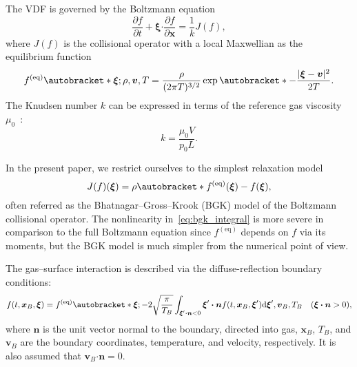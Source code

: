 \documentclass{elsarticle} %
\newcommand{\dd}{\mathrm{d}}
\newcommand{\pder}[2][]{\frac{\partial#1}{\partial#2}}
\DeclarePairedDelimiter\autobracket()       %
\newcommand{\br}[1]{\autobracket*{#1}}
\newcommand{\dxi}{\dd{\boldsymbol{\xi}}}
\newcommand{\bxi}{\boldsymbol{\xi}}
\newcommand{\bv}{\boldsymbol{v}}
\newcommand{\bn}{\boldsymbol{n}}
\newcommand{\bdot}{\boldsymbol{\cdot}}
\newcommand{\bx}{\boldsymbol{x}}
\newcommand{\equil}[1]{#1^\mathrm{(eq)}}
\newcommand{\refer}[1]{#1_0}
\begin{document}
The VDF is governed by the Boltzmann equation
\begin{equation}\label{eq:Boltzmann}
    \pder[f]{t} + \bxi\bdot\pder[f]{\bx} = \frac1kJ(f),
\end{equation}
where \(J(f)\) is the collisional operator with a local Maxwellian as the equilibrium function
\begin{equation}\label{eq:equilibrium}
    \equil{f}\br{\bxi; \rho, \bv, T} = \frac{\rho}{(2\pi T)^{3/2}}\exp\br{-\frac{|\bxi-\bv|^2}{2T}}.
\end{equation}
The Knudsen number \(k\) can be expressed in terms of the reference gas viscosity \(\refer\mu\)~\cite{Sharipov1998}:
\begin{equation}\label{eq:Knudsen_number}
    k = \frac{\refer\mu V}{\refer{p}L}.
\end{equation}

In the present paper, we restrict ourselves to the simplest relaxation model~\cite{Krook1954, Welander1954}
\begin{equation}\label{eq:bgk_integral}
    J(f)(\bxi) = \rho\br{\equil{f}(\bxi) - f(\bxi)},
\end{equation}
often referred as the Bhatnagar--Gross--Krook (BGK) model of the Boltzmann collisional operator.
The nonlinearity in~\eqref{eq:bgk_integral} is more severe in comparison to the full Boltzmann equation
since \(\equil{f}\) depends on \(f\) via its moments,
but the BGK model is much simpler from the numerical point of view.

The gas--surface interaction is described via the diffuse-reflection boundary conditions:
\begin{equation}\label{eq:diffuse}
    f(t,\bx_B,\bxi) = \equil{f} \br{ \bxi;
        -2\sqrt\frac\pi{T_B} \int_{\bxi'\bdot\bn<0} \bxi'\bdot\bn f(t,\bx_B,\bxi')\dxi', \bv_B, T_B
    } \quad (\bxi\bdot\bn>0),
\end{equation}
where \(\bn\) is the unit vector normal to the boundary, directed into gas,
\(\bx_B\), \(T_B\), and \(\bv_B\) are the boundary coordinates, temperature, and velocity, respectively.
It is also assumed that \(\bv_B\bdot\bn = 0\).
\end{document}
